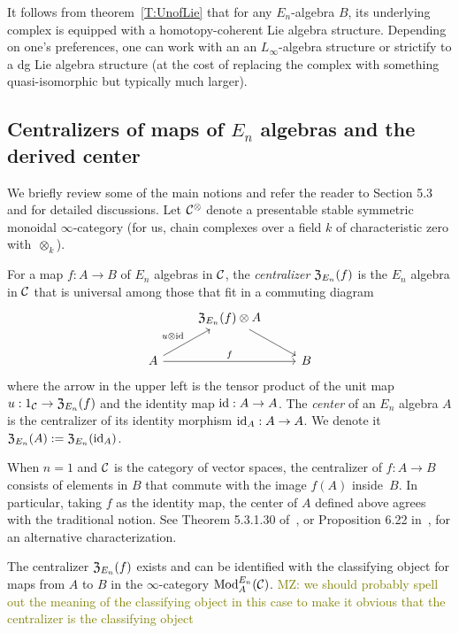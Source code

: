 \documentclass[11pt]{amsart}
\numberwithin{equation}{section}
\def\mahmoud{\textcolor{olive}{MZ: }\textcolor{olive}}
\begin{document}
\begin{rmk}
It follows from theorem~\ref{T:UnofLie} that for any $E_n$-algebra $B$, 
its underlying complex is equipped with a homotopy-coherent Lie algebra structure.
Depending on one's preferences, one can work with an an $L_\infty$-algebra structure or strictify to a dg Lie algebra structure (at the cost of replacing the complex with something quasi-isomorphic but typically much larger).
\end{rmk}

\subsection{Centralizers of maps of $E_n$ algebras and the derived center}
\label{sec: centralizer}

We briefly review some of the main notions and refer the reader to \cite{LurieHA} Section 5.3 and \cite{FrancisHH} for detailed discussions. Let $\mathcal C^\otimes$ denote a presentable stable symmetric monoidal $\infty$-category (for us, chain complexes over a field $k$ of characteristic zero with~$\otimes_k$).

\begin{dfn}\label{D:centralizer}
For a map $f: A \to B$ of $E_n$ algebras in $\mathcal C$, 
the {\em centralizer} ${\frak Z}_{E_n}(f)$ is the $E_n$ algebra in $\mathcal C$ that is universal among those that fit in a commuting diagram
\[
\begin{tikzcd}
& {\frak Z}_{E_n}(f) \otimes A \arrow[dr] & \\
A \arrow[ur, "u \otimes \id"] \arrow[rr, "f"] && B
\end{tikzcd}
\]
where the arrow in the upper left is the tensor product of the unit map $u: 1_\mathcal C \to {\frak Z}_{E_n}(f)$ and the identity map ${\rm id}: A \to A$.
The {\em center} of an $E_n$ algebra $A$ is the centralizer of its identity morphism ${\rm id}_A: A \to A$. 
We  denote it ${\frak Z}_{E_n}(A) := {\frak Z}_{E_n}({\rm id}_A)$.
\end{dfn}

When $n=1$ and $\mathcal C$ is the category of vector spaces, 
the centralizer of $f: A \to B$ consists of elements in $B$ that commute with the image $f(A)$ inside~$B$. 
In particular, taking $f$ as the identity map, 
the center of $A$ defined above agrees with the traditional notion. 
See Theorem 5.3.1.30 of~\cite{LurieHA}, or Proposition 6.22 in~\cite{GTZ3}, for an alternative characterization.

\begin{prp}
\label{T:centralizer=inthom} 
The centralizer ${\frak Z}_{E_n}(f)$ exists and can be identified with the classifying object for maps from $A$ to $B$ in the $\infty$-category ${\rm Mod}^{E_n}_A(\mathcal C)$. \mahmoud{we should probably spell out the meaning of the classifying object in this case to make it obvious that the centralizer is the classifying object}
\end{prp} 
\end{document}
